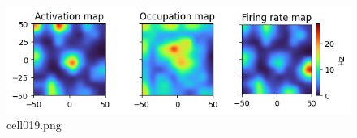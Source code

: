 \begin{figure}[ht]
	\centering
	\includegraphics[scale=0.8, max width=\linewidth]{./fig/appendix/grid-cells-decoding/cell019.png}
	\caption{cell019.png}
	\label{cell019.png}
\end{figure}